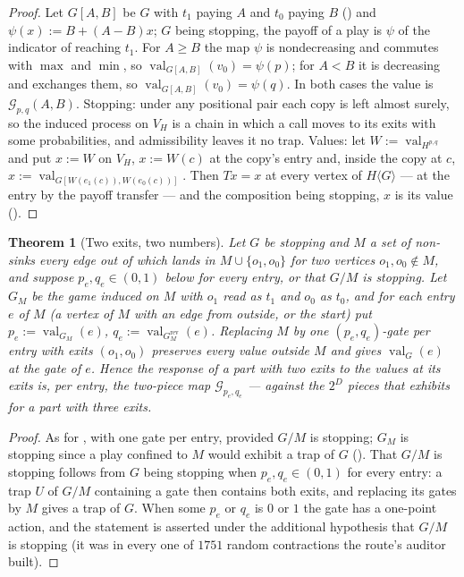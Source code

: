 \documentclass[11pt]{article}
\theoremstyle{plain}
\newtheorem{theorem}{Theorem}[section]
\theoremstyle{definition}
\DeclareMathOperator{\val}{val}
\begin{document}
\begin{proof}
Let $G[A,B]$ be $G$ with $t_1$ paying $A$ and $t_0$ paying $B$
() and $\psi(x):=B+(A-B)x$; $G$ being stopping, the
payoff of a play is $\psi$ of the indicator of reaching $t_1$. For
$A\ge B$ the map $\psi$ is nondecreasing and commutes with $\max$ and
$\min$, so $\val_{G[A,B]}(v_0)=\psi(p)$; for $A<B$ it is decreasing and
exchanges them, so $\val_{G[A,B]}(v_0)=\psi(q)$. In both cases the value
is $\mathcal G_{p,q}(A,B)$. Stopping: under any positional pair each copy
is left almost surely, so the induced process on $V_H$ is a chain in
which a call moves to its exits with some probabilities, and
admissibility leaves it no trap. Values: let $W:=\val_{H^{p,q}}$ and put
$x:=W$ on $V_H$, $x:=W(c)$ at the copy's entry and, inside the copy at
$c$, $x:=\val_{G[W(e_1(c)),W(e_0(c))]}$. Then $Tx=x$ at every vertex of
$H\langle G\rangle$ --- at the entry by the payoff transfer --- and the
composition being stopping, $x$ is its value ().
\end{proof}

\begin{theorem}[Two exits, two numbers]\label{thm:two-exit}
Let $G$ be stopping and $M$ a set of non-sinks every edge out of which
lands in $M\cup\{o_1,o_0\}$ for two vertices $o_1,o_0\notin M$, and
suppose $p_e,q_e\in(0,1)$ below for every entry, or that $G/M$ is
stopping. Let
$G_M$ be the game induced on $M$ with $o_1$ read as $t_1$ and $o_0$ as
$t_0$, and for each entry $e$ of $M$ (a vertex of $M$ with an edge from
outside, or the start) put $p_e:=\val_{G_M}(e)$,
$q_e:=\val_{G_M^{\mathrm{rev}}}(e)$. Replacing $M$ by one
$(p_e,q_e)$-gate per entry with exits $(o_1,o_0)$ preserves every value
outside $M$ and gives $\val_G(e)$ at the gate of $e$. Hence the response
of a part with two exits to the values at its exits is, per entry, the
two-piece map $\mathcal G_{p_e,q_e}$ --- against the $2^{D}$ pieces that
 exhibits for a part with three exits.
\end{theorem}

\begin{proof}
As for , with one gate per entry, provided $G/M$ is
stopping; $G_M$ is stopping since a play confined to $M$ would exhibit a
trap of $G$ (). That $G/M$ is stopping follows from
$G$ being stopping when $p_e,q_e\in(0,1)$ for every entry: a trap $U$ of
$G/M$ containing a gate then contains both exits, and replacing its gates
by $M$ gives a trap of $G$. When some $p_e$ or $q_e$ is $0$ or $1$ the
gate has a one-point action, and the statement is asserted under the
additional hypothesis that $G/M$ is stopping (it was in every one of
$1751$ random contractions the route's auditor built).
\end{proof}
\end{document}
